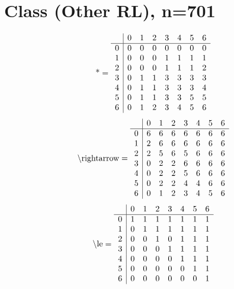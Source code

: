 \documentclass[11pt]{article}
\begin{document}
\section{Class (Other RL), n=701}
\[\text{*} = 
\begin{array}{r | r r r r r r r}
 & 0 & 1 & 2 & 3 & 4 & 5 & 6 \\ \hline
0 & 0 & 0 & 0 & 0 & 0 & 0 & 0 \\
1 & 0 & 0 & 0 & 1 & 1 & 1 & 1 \\
2 & 0 & 0 & 0 & 1 & 1 & 1 & 2 \\
3 & 0 & 1 & 1 & 3 & 3 & 3 & 3 \\
4 & 0 & 1 & 1 & 3 & 3 & 3 & 4 \\
5 & 0 & 1 & 1 & 3 & 3 & 5 & 5 \\
6 & 0 & 1 & 2 & 3 & 4 & 5 & 6 \\
\end{array}
\]
\[\text{\textbackslash rightarrow} = 
\begin{array}{r | r r r r r r r}
 & 0 & 1 & 2 & 3 & 4 & 5 & 6 \\ \hline
0 & 6 & 6 & 6 & 6 & 6 & 6 & 6 \\
1 & 2 & 6 & 6 & 6 & 6 & 6 & 6 \\
2 & 2 & 5 & 6 & 5 & 6 & 6 & 6 \\
3 & 0 & 2 & 2 & 6 & 6 & 6 & 6 \\
4 & 0 & 2 & 2 & 5 & 6 & 6 & 6 \\
5 & 0 & 2 & 2 & 4 & 4 & 6 & 6 \\
6 & 0 & 1 & 2 & 3 & 4 & 5 & 6 \\
\end{array}
\]
\[\text{\textbackslash le} = 
\begin{array}{r | r r r r r r r}
 & 0 & 1 & 2 & 3 & 4 & 5 & 6 \\ \hline
0 & 1 & 1 & 1 & 1 & 1 & 1 & 1 \\
1 & 0 & 1 & 1 & 1 & 1 & 1 & 1 \\
2 & 0 & 0 & 1 & 0 & 1 & 1 & 1 \\
3 & 0 & 0 & 0 & 1 & 1 & 1 & 1 \\
4 & 0 & 0 & 0 & 0 & 1 & 1 & 1 \\
5 & 0 & 0 & 0 & 0 & 0 & 1 & 1 \\
6 & 0 & 0 & 0 & 0 & 0 & 0 & 1 \\
\end{array}
\]
\end{document}
